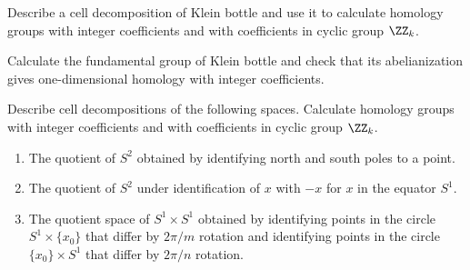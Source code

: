 



\exercises
\begin{xca}
Describe a cell decomposition of Klein bottle and use it to
calculate homology groups with integer coefficients and with
coefficients in cyclic group $\ZZ_k$.

Calculate the fundamental group of Klein bottle and check that
its abelianization gives one-dimensional homology with integer
coefficients.
\end{xca}
\begin{xca}
Describe cell decompositions of the following spaces. Calculate
homology groups with integer coefficients and with coefficients
in cyclic group $\ZZ_k$.
\begin{enumerate}
\item The quotient of $S^2$ obtained by identifying north and
  south poles to a point.
\item The quotient of $S^2$ under identification of $x$ with $-x$
  for $x$ in the equator $S^1$.
\item The quotient space of $S^1\times S^1$ obtained by
  identifying points in the circle $S^1\times\{x_0\}$ that differ
  by $2\pi/m$ rotation and identifying points in the circle
  $\{x_0\}\times S^1$ that differ by $2\pi/n$ rotation.
\end{enumerate}
\end{xca}
